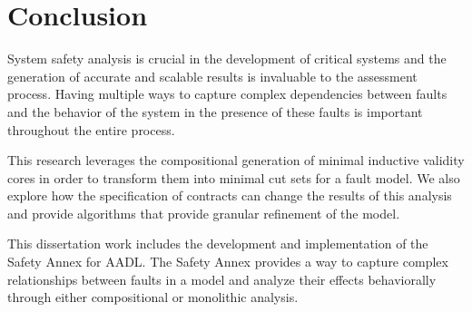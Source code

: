 \chapter{Conclusion}
\label{chap:conclusion}
System safety analysis is crucial in the development of critical systems and the generation of accurate and scalable results is invaluable to the assessment process. Having multiple ways to capture complex dependencies between faults and the behavior of the system in the presence of these faults is important throughout the entire process. 

This research leverages the compositional generation of minimal inductive validity cores in order to transform them into minimal cut sets for a fault model. We also explore how the specification of contracts can change the results of this analysis and provide algorithms that provide granular refinement of the model. 

This dissertation work includes the development and implementation of the Safety Annex for AADL.  The Safety Annex provides a way to capture complex relationships between faults in a model and analyze their effects behaviorally through either compositional or monolithic analysis.  
